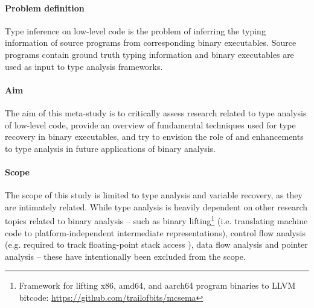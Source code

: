 
\paragraph{Problem definition}

Type inference on low-level code is the problem of inferring the typing information of source programs from corresponding binary executables. Source programs contain ground truth typing information and binary executables are used as input to type analysis frameworks.


\paragraph{Aim}

The aim of this meta-study is to critically assess research related to type analysis of low-level code, provide an overview of fundamental techniques used for type recovery in binary executables, and try to envision the role of and enhancements to type analysis in future applications of binary analysis.


\paragraph{Scope}

The scope of this study is limited to type analysis and variable recovery, as they are intimately related. While type analysis is heavily dependent on other research topics related to binary analysis -- such as binary lifting\footnote{Framework for lifting x86, amd64, and aarch64 program binaries to LLVM bitcode: \url{https://github.com/trailofbits/mcsema}} (i.e. translating machine code to platform-independent intermediate representations), control flow analysis (e.g. required to track floating-point stack access \cite{tie_reverse_engineering_of_types}), data flow analysis and pointer analysis -- these have intentionally been excluded from the scope.


